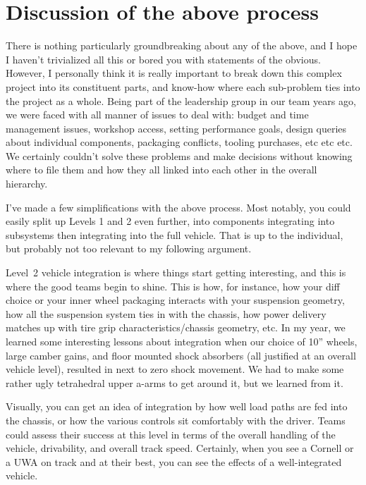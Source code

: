 \documentclass[10pt, a4paper, article, oneside, twocolumn, final]{memoir}
\begin{document}
\section*{Discussion of the above process}

There is nothing particularly groundbreaking about any of the above, and I hope I haven’t trivialized all this or bored you with statements of the obvious. However, I personally think it is really important to break down this complex project into its constituent parts, and know-how where each sub-problem ties into the project as a whole. Being part of the leadership group in our team years ago, we were faced with all manner of issues to deal with: budget and time management issues, workshop access, setting performance goals, design queries about individual components, packaging conflicts, tooling purchases, etc etc etc. We certainly couldn’t solve these problems and make decisions without knowing where to file them and how they all linked into each other in the overall hierarchy. 

I’ve made a few simplifications with the above process. Most notably, you could easily split up Levels 1 and 2 even further, into components integrating into subsystems then integrating into the full vehicle. That is up to the individual, but probably not too relevant to my following argument. 

Level~2 vehicle integration is where things start getting interesting, and this is where the good teams begin to shine. This is how, for instance, how your diff choice or your inner wheel packaging interacts with your suspension geometry, how all the suspension system ties in with the chassis, how power delivery matches up with tire grip characteristics/\allowbreak chassis geometry, etc. In my year, we learned some interesting lessons about integration when our choice of 10” wheels, large camber gains, and floor mounted shock absorbers (all justified at an overall vehicle level), resulted in next to zero shock movement. We had to make some rather ugly tetrahedral upper a-arms to get around it, but we learned from it. 

Visually, you can get an idea of integration by how well load paths are fed into the chassis, or how the various controls sit comfortably with the driver. Teams could assess their success at this level in terms of the overall handling of the vehicle, drivability, and overall track speed. Certainly, when you see a Cornell or a UWA on track and at their best, you can see the effects of a well-integrated vehicle. 
\end{document}
